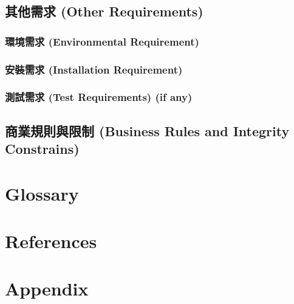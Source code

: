 \documentclass[a4paper, 12pt]{article}
\begin{document}
\subsection{其他需求 (Other Requirements)}
\subsubsection{環境需求 (Environmental Requirement)}
\subsubsection{安裝需求 (Installation Requirement)}
\subsubsection{測試需求 (Test Requirements) (if any)}
\subsection{商業規則與限制 (Business Rules and Integrity Constrains)}
\newpage

\section{Glossary}
\newpage

\section{References}
\newpage

\section{Appendix}
\newpage
\end{document}
